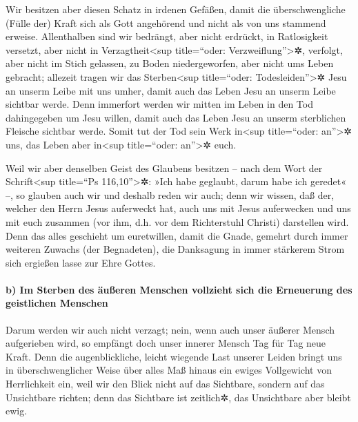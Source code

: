  Wir besitzen aber diesen Schatz in irdenen Gefäßen, damit
die überschwengliche (Fülle der) Kraft sich als Gott angehörend und
nicht als von uns stammend erweise.  Allenthalben sind wir
bedrängt, aber nicht erdrückt, in Ratlosigkeit versetzt, aber nicht in
Verzagtheit\textless sup title=``oder: Verzweiflung''\textgreater✲,
 verfolgt, aber nicht im Stich gelassen, zu Boden
niedergeworfen, aber nicht ums Leben gebracht;  allezeit
tragen wir das Sterben\textless sup title=``oder:
Todesleiden''\textgreater✲ Jesu an unserm Leibe mit uns umher, damit
auch das Leben Jesu an unserm Leibe sichtbar werde.  Denn
immerfort werden wir mitten im Leben in den Tod dahingegeben um Jesu
willen, damit auch das Leben Jesu an unserm sterblichen Fleische
sichtbar werde.  Somit tut der Tod sein Werk
in\textless sup title=``oder: an''\textgreater✲ uns, das Leben aber
in\textless sup title=``oder: an''\textgreater✲ euch.

 Weil wir aber denselben Geist des Glaubens besitzen --
nach dem Wort der Schrift\textless sup title=``Ps 116,10''\textgreater✲:
»Ich habe geglaubt, darum habe ich geredet« --, so glauben auch wir und
deshalb reden wir auch;  denn wir wissen, daß der,
welcher den Herrn Jesus auferweckt hat, auch uns mit Jesus auferwecken
und uns mit euch zusammen (vor ihm, d.h. vor dem Richterstuhl Christi)
darstellen wird.  Denn das alles geschieht um
euretwillen, damit die Gnade, gemehrt durch immer weiteren Zuwachs (der
Begnadeten), die Danksagung in immer stärkerem Strom sich ergießen lasse
zur Ehre Gottes.

\hypertarget{b-im-sterben-des-uxe4uuxdferen-menschen-vollzieht-sich-die-erneuerung-des-geistlichen-menschen}{%
\paragraph{b) Im Sterben des äußeren Menschen vollzieht sich die
Erneuerung des geistlichen
Menschen}\label{b-im-sterben-des-uxe4uuxdferen-menschen-vollzieht-sich-die-erneuerung-des-geistlichen-menschen}}

 Darum werden wir auch nicht verzagt; nein, wenn auch
unser äußerer Mensch aufgerieben wird, so empfängt doch unser innerer
Mensch Tag für Tag neue Kraft.  Denn die augenblickliche,
leicht wiegende Last unserer Leiden bringt uns in überschwenglicher
Weise über alles Maß hinaus ein ewiges Vollgewicht von Herrlichkeit ein,
 weil wir den Blick nicht auf das Sichtbare, sondern auf
das Unsichtbare richten; denn das Sichtbare ist zeitlich✲, das
Unsichtbare aber bleibt ewig.

